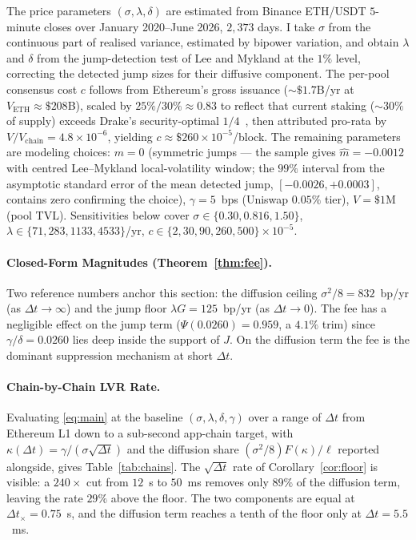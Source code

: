 \documentclass[runningheads]{llncs}
\newcommand{\dt}{\Delta t}
\newcommand{\1}{\mathbf{1}}
\begin{document}
The price parameters $(\sigma,\lambda,\delta)$ are estimated from Binance ETH/USDT $5$-minute closes over January 2020--June 2026, $2{,}373$ days. I take $\sigma$ from the continuous part of realised variance, estimated by bipower variation, and obtain $\lambda$ and $\delta$ from the jump-detection test of Lee and Mykland at the $1\%$ level, correcting the detected jump sizes for their diffusive component. The per-pool consensus cost $c$ follows from Ethereum's gross issuance ($\sim\!\$1.7$B/yr at $V_{\text{ETH}} \approx \$208$B), scaled by $25\%/30\% \approx 0.83$ to reflect that current staking ($\sim\!30\%$ of supply) exceeds Drake's security-optimal $1/4$~\cite{drake2025croissant,elowsson2024endgame}, then attributed pro-rata by $V/V_{\text{chain}} = 4.8 \times 10^{-6}$, yielding $c \approx \$260 \times 10^{-5}$/block. The remaining parameters are modeling choices: $m = 0$ (symmetric jumps --- the sample gives $\hat m = -0.0012$ with centred Lee--Mykland local-volatility window; the $99\%$ interval from the asymptotic standard error of the mean detected jump, $[-0.0026, +0.0003]$, contains zero confirming the choice), $\gamma = 5$~bps (Uniswap $0.05\%$ tier), $V = \$1$M (pool TVL). Sensitivities below cover $\sigma \in \{0.30, 0.816, 1.50\}$, $\lambda \in \{71, 283, 1133, 4533\}$/yr, $c \in \{2, 30, 90, 260, 500\} \times 10^{-5}$.

\paragraph{Closed-Form Magnitudes (Theorem~\ref{thm:fee}).}
Two reference numbers anchor this section: the diffusion ceiling $\sigma^2/8 = 832$~bp/yr (as $\dt \to \infty$) and the jump floor $\lambda G = 125$~bp/yr (as $\dt \to 0$). The fee has a negligible effect on the jump term ($\Psi(0.0260) = 0.959$, a $4.1\%$ trim) since $\gamma/\delta = 0.0260$ lies deep inside the support of $J$. On the diffusion term the fee is the dominant suppression mechanism at short $\dt$.

\paragraph{Chain-by-Chain LVR Rate.}
Evaluating \eqref{eq:main} at the baseline $(\sigma,\lambda,\delta,\gamma)$ over a range of $\dt$ from Ethereum L1 down to a sub-second app-chain target, with $\kappa(\dt) = \gamma/(\sigma\sqrt{\dt})$ and the diffusion share $(\sigma^2/8)F(\kappa)/\ell$ reported alongside, gives Table~\ref{tab:chains}. The $\sqrt{\dt}$ rate of Corollary~\ref{cor:floor} is visible: a $240\times$ cut from $12$~s to $50$~ms removes only $89\%$ of the diffusion term, leaving the rate $29\%$ above the floor. The two components are equal at $\dt_\times = 0.75$~s, and the diffusion term reaches a tenth of the floor only at $\dt = 5.5$~ms.
\end{document}
